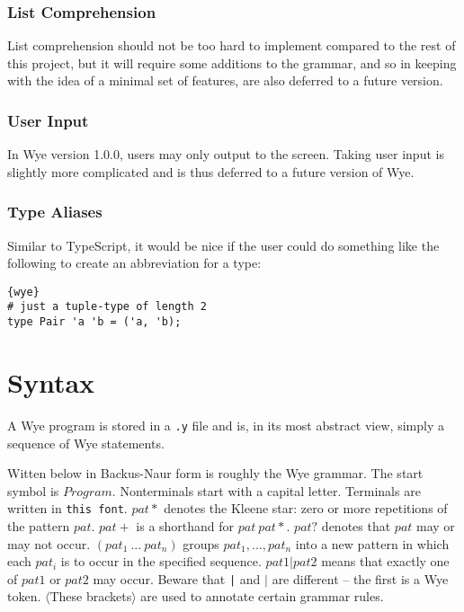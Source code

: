 \documentclass[a4paper, 12pt]{article}
\newcommand{\version}{1.0.0}
\begin{document}
\subsubsection{List Comprehension}
List comprehension should not be too hard to implement compared to the rest of this project, but it will require some additions to the grammar, and so in keeping with the idea of a minimal set of features, are also deferred to a future version.

\subsubsection{User Input}
In Wye version \version{}, users may only output to the screen. Taking user input is slightly more complicated and is thus deferred to a future version of Wye.

\subsubsection{Type Aliases}
Similar to TypeScript, it would be nice if the user could do something like the following to create an abbreviation for a type:
\begin{lstlisting}{wye}
# just a tuple-type of length 2
type Pair 'a 'b = ('a, 'b);
\end{lstlisting}

\section{Syntax}
A Wye program is stored in a \texttt{.y} file and is, in its most abstract view, simply a sequence of Wye statements.

Witten below in Backus-Naur form is roughly the Wye grammar. The start symbol is $Program$. Nonterminals start with a capital letter. Terminals are written in \texttt{this font}. $pat*$ denotes the Kleene star: zero or more repetitions of the pattern $pat$. $pat+$ is a shorthand for $pat\: pat*$. $pat?$ denotes that $pat$ may or may not occur. $( pat_1\:...\: pat_n )$ groups $pat_1, ..., pat_n$ into a new pattern in which each $pat_i$ is to occur in the specified sequence. $pat1 | pat2$ means that exactly one of $pat1$ or $pat2$ may occur. Beware that \texttt{|} and $|$ are different -- the first is a Wye token. $\langle$These brackets$\rangle$ are used to annotate certain grammar rules.
\end{document}
